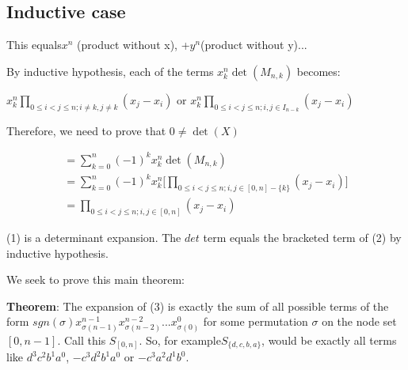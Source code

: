 \documentclass[11pt, oneside]{article} 	%
\begin{document}
\subsection{Inductive case} This equals$ x^n$ (product without x), +$ y^n $(product without y)...
\begin{comment}
- Represent as a graph tournament, n nodes, (n choose 2) edges.  There are 2^(n choose 2) possibilities.
- Each term (+/-) x_0^a_0*x_1^a_1...*x_n^a_n, where sum a_i = (n choose 2), represents one possible tournament on a directed complete graph of size n
- If there are no cycles in a given tournamnet
  - then it's of the form b^n c^n-1 ... x^1 y^0 for some b,c,...y in x_i.
- If there are ctycles in a tournament
  - Any even cycle implies an odd cycle (quick proof)
  - Therfore there's an odd cycle
  - Reversing an odd cycle produces a different graph with an odd cycle and flipped sign.
- For a tournament config that is NOT a topo sort (has a cycle)
  - There are as many positivies as negatives (PROVE?)
  - So the terms cancel out
  - Therefore everything is of the form b^n c^n-1 ... x^1 y^0
  - So big product up to n is x^n(prodcut without x) + y^n(product without y..).
*** This is zero if and only if x_i = x_j for some
*** Therefore, only one solution for n distinct points on a polynomial of size n.

\end{comment}


By inductive hypothesis, each of the terms $x_k^n\det(M_{n,k})$ becomes:

$x_k^n\prod_{0 \leq i < j \leq n; i \neq k, j \neq k} (x_j - x_i)$ 
or 
$x_k^n\prod_{0 \leq i < j \leq n; i, j \in I_{n-{k}}} (x_j - x_i)$ 


Therefore, we need to prove that $0 \neq \det(X)$

\begin{align}
= \sum_{k=0}^n (-1)^k x_k^n\det(M_{n, k}) \\
= \sum_{k=0}^n (-1)^k x_k^n\Big[\prod_{0 \leq i < j \leq n; i, j \in [0,n] - \{k\}} (x_j - x_i) \Big] \\
=\prod_{0 \leq i < j \leq n; i, j \in [0,n]} (x_j - x_i) 
\end{align}

(1) is a determinant expansion.  The $det$ term equals the bracketed term of (2) by inductive hypothesis.



We seek to prove this main theorem:

\textbf{Theorem}: The expansion of (3) is exactly the sum of all possible terms of the form $sgn(\sigma) x_{\sigma(n-1)}^{n-1} x_{\sigma(n-2)}^{n-2} ... x_{\sigma(0)}^{0} $ for some permutation $\sigma$ on the node set $[0, n-1]$.  Call this $S_{[0,n]}$.  So, for example$S_{\{d,c,b,a\}}$, would be exactly all terms like $d^3c^2b^1a^0$, $-c^3d^2b^1a^0$ or $-c^3a^2d^1b^0$.
\end{document}
